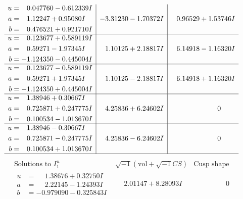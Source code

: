 \documentclass[1p]{elsarticle_modified}
\theoremstyle{definition}
\newcommand{\I}{\sqrt{-1}}
\begin{document}
$$\begin{array}{c|c|c}
\begin{aligned}
u &= \phantom{-}0.047760 - 0.612339 I \\
a &= \phantom{-}1.12247 + 0.95080 I \\
b &= \phantom{-}0.476521 + 0.921710 I\end{aligned}
 & -3.31230 - 1.70372 I & \phantom{-}0.96529 + 1.53746 I \\ \hline\begin{aligned}
u &= \phantom{-}0.123677 + 0.589119 I \\
a &= \phantom{-}0.59271 - 1.97345 I \\
b &= -1.124350 - 0.445004 I\end{aligned}
 & \phantom{-}1.10125 + 2.18817 I & \phantom{-}6.14918 - 1.16320 I \\ \hline\begin{aligned}
u &= \phantom{-}0.123677 - 0.589119 I \\
a &= \phantom{-}0.59271 + 1.97345 I \\
b &= -1.124350 + 0.445004 I\end{aligned}
 & \phantom{-}1.10125 - 2.18817 I & \phantom{-}6.14918 + 1.16320 I \\ \hline\begin{aligned}
u &= \phantom{-}1.38946 + 0.30667 I \\
a &= \phantom{-}0.725871 + 0.247775 I \\
b &= \phantom{-}0.100534 - 1.013670 I\end{aligned}
 & \phantom{-}4.25836 + 6.24602 I & \phantom{-0.000000 } 0 \\ \hline\begin{aligned}
u &= \phantom{-}1.38946 - 0.30667 I \\
a &= \phantom{-}0.725871 - 0.247775 I \\
b &= \phantom{-}0.100534 + 1.013670 I\end{aligned}
 & \phantom{-}4.25836 - 6.24602 I & \phantom{-0.000000 } 0\\
 \hline 
 \end{array}$$\newpage$$\begin{array}{c|c|c}  
\text{Solutions to }I^u_{1}& \I (\text{vol} + \sqrt{-1}CS) & \text{Cusp shape}\\
 \hline 
\begin{aligned}
u &= \phantom{-}1.38676 + 0.32750 I \\
a &= \phantom{-}2.22145 - 1.24393 I \\
b &= -0.979090 - 0.325843 I\end{aligned}
 & \phantom{-}2.01147 + 8.28093 I & \phantom{-0.000000 } 0 \\ \hline\begin{aligned}

\end{aligned}
\end{array}$$
\end{document}
